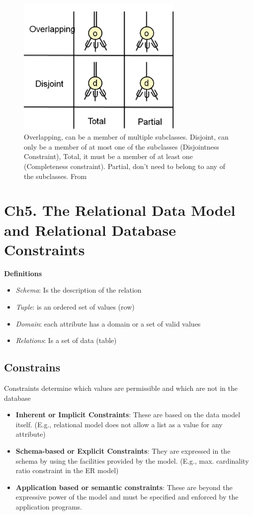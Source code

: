 \begin{figure}[!h]
    \centering
    \includegraphics[width=8cm]{image/constraints_specialization-generalization.png}
    \caption{Overlapping, can be a member of multiple subclasses. Disjoint, can only be a member of at most one of the subclasses (Disjointness Constraint),  Total, it must be a member of at least one (Completeness constraint). Partial, don't need to belong to any of the subclasses. From \cite{}}
\end{figure}


\newpage
\section{Ch5. The Relational Data Model and Relational Database Constraints}
\noindent\textbf{Definitions}
\begin{itemize}
    \item \textit{Schema}: Is the description of the relation
    \item \textit{Tuple}: is an ordered set of values (row)
    \item \textit{Domain}: each attribute has a domain or a set of valid values
    \item \textit{Relations}: Is a set of data (table)
\end{itemize}

\subsection{Constrains}
Constraints determine which values are permissible and 
which are not in the database
\begin{itemize}
    \item \textbf{Inherent or Implicit Constraints}: These are based on the data model itself. (E.g., relational model does not allow a list as a value for any attribute)
    \item \textbf{Schema-based or Explicit Constraints}: They are expressed in the schema by using the facilities provided by the model. (E.g., max. cardinality ratio constraint in the ER model) 
    \item \textbf{Application based or semantic constraints}: These are beyond the expressive power of the model and must be specified and enforced by the application programs. 
\end{itemize}


